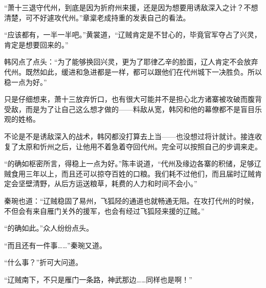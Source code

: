 “萧十三退守代州，到底是因为折府州来援，还是因为想要用诱敌深入之计？不想清楚，可不好遽攻代州。”章楶老成持重的发表自己的看法。

“应该都有，一半一半吧。”黄裳道，“辽贼肯定是不甘心的，毕竟官军夺占了兴灵，肯定是想要回来的。”

韩冈点了点头：“为了能够换回兴灵，更为了耶律乙辛的脸面，辽人肯定不会放弃代州。既然如此，缓进和急进都是一样，都可以跟他们在代州城下一决胜负。所以稳一点为好。”

只是仔细想来，萧十三放弃忻口，也有很大可能并不是担心北方诸寨被攻破而腹背受敌，而是为了让自己这么想才做的——料敌从宽，韩冈和他的幕僚都不是盲目乐观的姓格。

不论是不是诱敌深入的战术，韩冈都没打算去上当——也没想过将计就计。接连收复了太原和忻州之后，让他用不着急着夺回代州。完全可以按照自己的步调来走。

“的确如枢密所言，得稳上一点为好。”陈丰说道，“代州及缘边各寨的积储，足够辽贼食用三年以上，而且还可以掠夺百姓的口粮。我们耗不过他们，而且届时辽贼肯定会坚壁清野，从后方运送粮草，耗费的人力和时间不会小。”

秦琬也道：“辽贼稳固了易州，飞狐陉的通道也就畅通无阻。在攻打代州的时候，不但会有来自雁门关外的援军，也会有经过飞狐陉来援的辽贼。”

“的确如此。”众人纷纷点头。

“而且还有一件事……”秦琬又道。

“什么事？”折可大问道。

“辽贼南下，不只是雁门一条路，神武那边……同样也是啊！”

